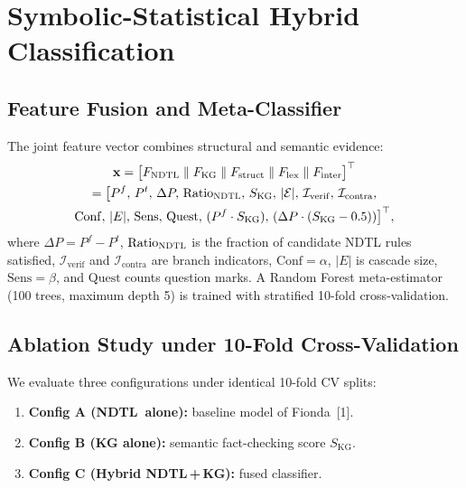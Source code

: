 \documentclass[10pt,twocolumn,a4paper]{article}
\newcommand{\NDTL}{\textsc{NDTL}}
\newcommand{\SKG}{S_{\mathrm{KG}}}
\begin{document}
\section{Symbolic-Statistical Hybrid Classification}
\subsection{Feature Fusion and Meta-Classifier}
The joint feature vector combines structural and semantic evidence:
\begin{multline}
\mathbf{x}=\big[F_{\mathrm{NDTL}} \parallel F_{\mathrm{KG}} \parallel F_{\mathrm{struct}} \parallel F_{\mathrm{lex}} \parallel F_{\mathrm{inter}}\big]^{\top}\\
=\big[P^f,\,P^t,\,\Delta P,\,\mathrm{Ratio}_{\NDTL},\,\SKG,\,|\mathcal{E}|,\,\mathcal{I}_{\mathrm{verif}},\,\mathcal{I}_{\mathrm{contra}},\\
\mathrm{Conf},\,|E|,\,\mathrm{Sens},\,\mathrm{Quest},\,(P^f\cdot\SKG),\,(\Delta P\cdot(\SKG-0.5))\big]^{\top},
\end{multline}
where $\Delta P = P^f - P^t$, $\mathrm{Ratio}_{\NDTL}$ is the fraction of candidate NDTL rules satisfied, $\mathcal{I}_{\mathrm{verif}}$ and $\mathcal{I}_{\mathrm{contra}}$ are branch indicators, $\mathrm{Conf} = \alpha$, $|E|$ is cascade size, $\mathrm{Sens} = \beta$, and $\mathrm{Quest}$ counts question marks. A Random Forest meta-estimator (100 trees, maximum depth 5) is trained with stratified 10-fold cross-validation.
 
\subsection{Ablation Study under 10-Fold Cross-Validation}
We evaluate three configurations under identical 10-fold CV splits:
\begin{enumerate}
  \item \textbf{Config A (\NDTL\ alone):} baseline model of Fionda~[1].
  \item \textbf{Config B (KG alone):} semantic fact-checking score $\SKG$.
  \item \textbf{Config C (Hybrid \NDTL\,+\,KG):} fused classifier.
\end{enumerate}
 
\end{document}
